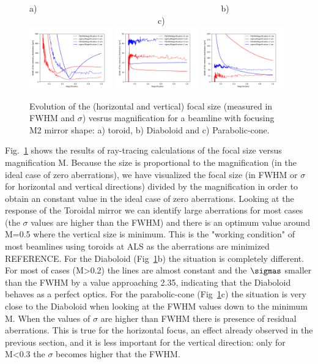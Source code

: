 \documentclass[a4paper, 11pt]{article}
\newcommand{\inred}[1]{{\color{red}#1}}
\begin{document}
\begin{figure}[h]
\flushleft
a)~~~~~~~~~~~~~~~~~~~~~~~~~~~~~~~~~~~~~~~~~~~b)~~~~~~~~~~~~~~~~~~~~~~~~~~~~~~~~~~~~~~~~~~~c)\\
\centering
\includegraphics[width=0.32\textwidth]{figures/scan_toroid.png}
\includegraphics[width=0.32\textwidth]{figures/scan_diaboloid.png}
\includegraphics[width=0.32\textwidth]{figures/scan_parabolic-cone.png}

\caption{\label{fig:scan}
Evolution of the (horizontal and vertical) focal size (measured in FWHM and $\sigma$) vesrus magnification for a beamline with focusing M2 mirror shape: a) toroid, b) Diaboloid and c) Parabolic-cone. 
}
\end{figure}


Fig.~\ref{fig:scan} shows the results of ray-tracing calculations of the focal size versus magnification M. Because the size is proportional to the magnification (in the ideal case of zero aberrations), we have visualized the focal size (in FWHM or $\sigma$ for horizontal and vertical directions) divided by the magnification in order to obtain an constant value in the ideal case of zero aberrations. Looking at the response of the Toroidal mirror we can identify large aberrations for most cases (the $\sigma$ values are higher than the FWHM) and there is an optimum value around M=0.5 where the vertical size is minimum. This is the "working condition" of most beamlines using toroids at ALS as the aberrations are minimized \inred{REFERENCE}. For the Diaboloid (Fig~\ref{fig:scan}b) the situation is completely different. For most of cases (M>0.2) the lines are almost constant and the $\sigmas$ smaller than the FWHM by a value approaching 2.35, indicating that the Diaboloid behaves as a perfect optics. For the parabolic-cone (Fig~\ref{fig:scan}c) the situation is very close to the Diaboloid when looking at the FWHM values down to the minimum M. When the values of $\sigma$ are higher than FWHM there is presence of residual aberrations. This is true for the horizontal focus, an effect already observed in the previous section, and it is less important for the vertical direction: only for M<0.3 the $\sigma$ becomes higher that the FWHM.  
\end{document}
